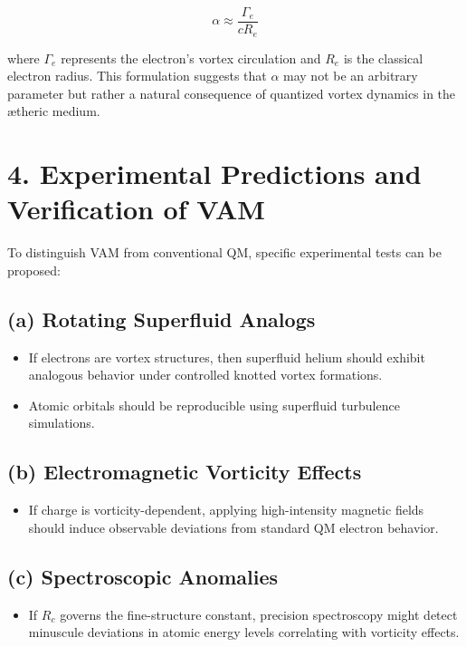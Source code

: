 \[
    \alpha \approx \frac{\Gamma_e}{c R_e}
\]

where \(\Gamma_e\) represents the electron's vortex circulation and \(R_e\) is the classical electron radius. This formulation suggests that \(\alpha\) may not be an arbitrary parameter but rather a natural consequence of quantized vortex dynamics in the ætheric medium.

\section*{4. Experimental Predictions and Verification of VAM}

To distinguish VAM from conventional QM, specific experimental tests can be proposed:

\subsection*{(a) Rotating Superfluid Analogs}

\begin{itemize}
    \item If electrons are vortex structures, then superfluid helium should exhibit analogous behavior under controlled knotted vortex formations.
    \item Atomic orbitals should be reproducible using superfluid turbulence simulations.
\end{itemize}

\subsection*{(b) Electromagnetic Vorticity Effects}

\begin{itemize}
    \item If charge is vorticity-dependent, applying high-intensity magnetic fields should induce observable deviations from standard QM electron behavior.
\end{itemize}

\subsection*{(c) Spectroscopic Anomalies}

\begin{itemize}
    \item If \(R_c\) governs the fine-structure constant, precision spectroscopy might detect minuscule deviations in atomic energy levels correlating with vorticity effects.
\end{itemize}

